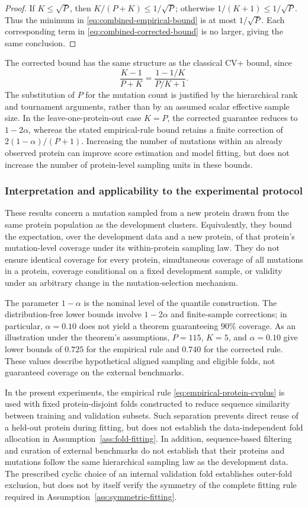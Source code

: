 \documentclass[11pt]{article}
\begin{document}
\begin{proof}
If $K\leq\sqrt P$, then $K/(P+K)\leq1/\sqrt P$; otherwise $1/(K+1)\leq1/\sqrt P$. Thus the minimum in \eqref{eq:combined-empirical-bound} is at most $1/\sqrt P$. Each corresponding term in \eqref{eq:combined-corrected-bound} is no larger, giving the same conclusion.
\end{proof}

The corrected bound has the same structure as the classical CV+ bound, since
\[
 \frac{K-1}{P+K}=\frac{1-1/K}{P/K+1}.
\]
The substitution of $P$ for the mutation count is justified by the hierarchical rank and tournament arguments, rather than by an assumed scalar effective sample size. In the leave-one-protein-out case $K=P$, the corrected guarantee reduces to $1-2\alpha$, whereas the stated empirical-rule bound retains a finite correction of $2(1-\alpha)/(P+1)$. Increasing the number of mutations within an already observed protein can improve score estimation and model fitting, but does not increase the number of protein-level sampling units in these bounds.

\subsubsection{Interpretation and applicability to the experimental protocol}

These results concern a mutation sampled from a new protein drawn from the same protein population as the development clusters. Equivalently, they bound the expectation, over the development data and a new protein, of that protein's mutation-level coverage under its within-protein sampling law. They do not ensure identical coverage for every protein, simultaneous coverage of all mutations in a protein, coverage conditional on a fixed development sample, or validity under an arbitrary change in the mutation-selection mechanism.

The parameter $1-\alpha$ is the nominal level of the quantile construction. The distribution-free lower bounds involve $1-2\alpha$ and finite-sample corrections; in particular, $\alpha=0.10$ does not yield a theorem guaranteeing $90\%$ coverage. As an illustration under the theorem's assumptions, $P=115$, $K=5$, and $\alpha=0.10$ give lower bounds of $0.725$ for the empirical rule and $0.740$ for the corrected rule. These values describe hypothetical aligned sampling and eligible folds, not guaranteed coverage on the external benchmarks.

In the present experiments, the empirical rule \eqref{eq:empirical-protein-cvplus} is used with fixed protein-disjoint folds constructed to reduce sequence similarity between training and validation subsets. Such separation prevents direct reuse of a held-out protein during fitting, but does not establish the data-independent fold allocation in Assumption~\ref{ass:fold-fitting}. In addition, sequence-based filtering and curation of external benchmarks do not establish that their proteins and mutations follow the same hierarchical sampling law as the development data. The prescribed cyclic choice of an internal validation fold establishes outer-fold exclusion, but does not by itself verify the symmetry of the complete fitting rule required in Assumption~\ref{ass:symmetric-fitting}.
\end{document}
